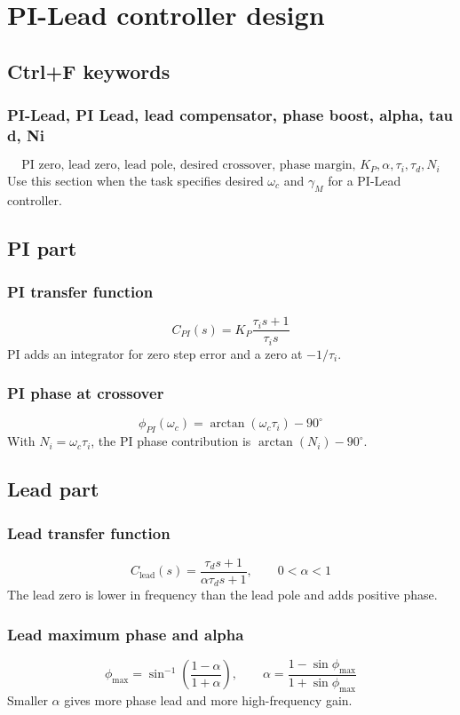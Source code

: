 \section{PI-Lead controller design}

\subsection{Ctrl+F keywords}

\subsubsection{PI-Lead, PI Lead, lead compensator, phase boost, alpha, tau d, Ni}
\[
\text{PI zero, lead zero, lead pole, desired crossover, phase margin, }K_P,\alpha,\tau_i,\tau_d,N_i
\]
Use this section when the task specifies desired \(\omega_c\) and \(\gamma_M\) for a PI-Lead controller.

\subsection{PI part}

\subsubsection{PI transfer function}
\[
C_{PI}(s)=K_P\frac{\tau_i s+1}{\tau_i s}
\]
PI adds an integrator for zero step error and a zero at \(-1/\tau_i\).

\subsubsection{PI phase at crossover}
\[
\phi_{PI}(\omega_c)=\arctan(\omega_c\tau_i)-90^\circ
\]
With \(N_i=\omega_c\tau_i\), the PI phase contribution is \(\arctan(N_i)-90^\circ\).

\subsection{Lead part}

\subsubsection{Lead transfer function}
\[
C_{\mathrm{lead}}(s)=\frac{\tau_d s+1}{\alpha\tau_d s+1},\qquad 0<\alpha<1
\]
The lead zero is lower in frequency than the lead pole and adds positive phase.

\subsubsection{Lead maximum phase and alpha}
\[
\phi_{\max}=\sin^{-1}\left(\frac{1-\alpha}{1+\alpha}\right),\qquad
\alpha=\frac{1-\sin\phi_{\max}}{1+\sin\phi_{\max}}
\]
Smaller \(\alpha\) gives more phase lead and more high-frequency gain.

